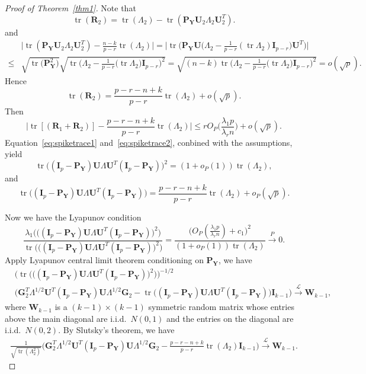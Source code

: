 \documentclass[12pt]{article} %
\DeclareMathOperator{\mytr}{tr}
\newcommand{\bP}{\mathbf{P}}
\newcommand{\bY}{\mathbf{Y}}
\newcommand{\bG}{\mathbf{G}}
\newcommand{\bR}{\mathbf{R}}
\newcommand{\bI}{\mathbf{I}}
\newcommand{\bU}{\mathbf{U}}
\newcommand{\bW}{\mathbf{W}}
\theoremstyle{definition}
\begin{document}
\begin{proof}[\textrm{Proof of Theorem~\ref{thm1}}]
Note that
    $$
    \mytr(\bR_2)
    =
    \mytr(\Lambda_2)-\mytr(\bP_{\bY}\bU_2\Lambda_2 \bU_2^T).
    $$ 
and
    $$
    \begin{aligned}
        &
        \big|
    \mytr(\bP_{\bY}\bU_2\Lambda_2 \bU_2^T)
    -\frac{n-k}{p-r}\mytr(\Lambda_2)
    \big|
    =
    \Big|
        \mytr\Big(\bP_{\bY} \bU \big(\Lambda_2-\frac{1}{p-r} (\mytr \Lambda_2) \bI_{p-r} \big) \bU^T\Big)
    \Big|
        \\
        \leq &
        \sqrt{\mytr \big(\bP_{\bY}^2\big)}
        \sqrt{\mytr \Big(\Lambda_2-\frac{1}{p-r}\big(\mytr \Lambda_2\big) \bI_{p-r}\Big)^2}
        =\sqrt{(n-k)\mytr \Big(\Lambda_2-\frac{1}{p-r}\big(\mytr \Lambda_2\big) \bI_{p-r}\Big)^2}
        =o(\sqrt{p}).
    \end{aligned}
    $$
    Hence 
    $$
    \mytr(\bR_2)
    =
    \frac{p-r-n+k}{p-r}\mytr(\Lambda_2)+o(\sqrt{p}).
    $$
    Then
\begin{equation}\label{eq:spiketrace2}
\big| \mytr [(\bR_1+\bR_2)]-\frac{p-r-n+k}{p-r}\mytr(\Lambda_2)\big|\leq 
rO_P\big(\frac{\lambda_1 p}{\lambda_r n}\big)+o(\sqrt{p}).
\end{equation}
Equation~\eqref{eq:spiketrace1} and~\eqref{eq:spiketrace2}, conbined with the assumptions, yield
$$
    \mytr\big((\bI_p-\bP_{\bY})\bU\Lambda \bU^T (\bI_p-\bP_{\bY})\big)^2 
 =(1+o_P(1))\mytr(\Lambda_2),
$$
and
$$
\mytr\big((\bI_p-\bP_{\bY})\bU\Lambda \bU^T (\bI_p-\bP_{\bY})\big)
= \frac{p-r-n+k}{p-r}\mytr(\Lambda_2)+o_P(\sqrt{p}).
$$

Now we have the Lyapunov condition
$$
\frac{\lambda_1\Big(\big((\bI_p-\bP_{\bY})\bU\Lambda \bU^T (\bI_p-\bP_{\bY})\big)^2\Big)}{\mytr \Big( \big((\bI_p-\bP_{\bY})\bU\Lambda \bU^T (\bI_p-\bP_{\bY})\big)^2\Big)}
=
\frac{
\big( O_P(\frac{\lambda_1 p}{\lambda_r n})+c_1\big)^2
}{
    (1+o_P(1))\mytr(\Lambda_2)
}
\xrightarrow{P} 0.
$$
Apply Lyapunov central limit theorem conditioning on $\bP_{\bY}$, we have
$$
\begin{aligned}
    &\Big(\mytr \Big( \big((\bI_p-\bP_{\bY})\bU\Lambda \bU^T (\bI_p-\bP_{\bY})\big)^2\Big) \Big)^{-1/2}\\
    &\big( \bG_2^T \Lambda^{1/2}\bU^T (\bI_p-\bP_{\bY})\bU\Lambda^{1/2}\bG_2
    -\mytr\big((\bI_p-\bP_{\bY})\bU\Lambda \bU^T (\bI_p-\bP_{\bY})\big)
     \bI_{k-1} \big)
\xrightarrow{\mathcal{L}} \bW_{k-1},
\end{aligned}
$$
where $\bW_{k-1}$ is a $(k-1)\times(k-1)$ symmetric random matrix whose entries above the main diagonal are i.i.d.\ $N(0,1)$ and the entries on the diagonal are i.i.d.\ $N(0,2)$.
By Slutsky's theorem, we have
$$
\begin{aligned}
    \frac{1}{\sqrt{\mytr(\Lambda_2^2)}}
    \big( \bG_2^T \Lambda^{1/2} \bU^T (\bI_p-\bP_{\bY})\bU\Lambda^{1/2}\bG_2
    -\tfrac{p-r-n+k}{p-r}\mytr(\Lambda_2)\bI_{k-1} \big)
\xrightarrow{\mathcal{L}} \bW_{k-1}.
\end{aligned}
$$




\end{proof}
\end{document}
